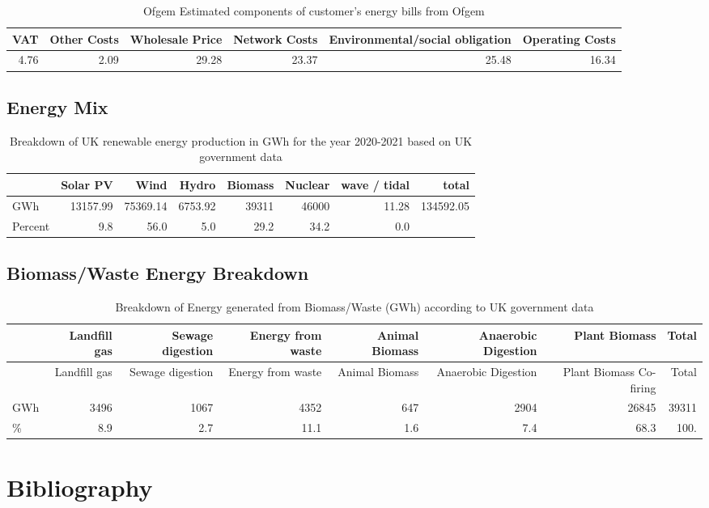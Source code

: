 \documentclass[11pt]{article}
\numberwithin{equation}{section}
\begin{document}
\begin{table}[H]
\caption{\label{tabBillBreakdown}Ofgem Estimated components of customer's energy bills from Ofgem \cite{ofgemBillBreakdown}}
\centering
\begin{tabular}{rrrrrr}
VAT & Other Costs & Wholesale Price & Network Costs & Environmental/social obligation & Operating Costs\\
\hline
4.76 & 2.09 & 29.28 & 23.37 & 25.48 & 16.34\\
\end{tabular}
\end{table}

\subsection{Energy Mix}
\label{sec:org42d2268}
\begin{table}[H]
\caption{\label{tabUkGreenEnergy2020}Breakdown of UK renewable energy production in GWh for the year 2020-2021 based on UK government data \cite{RenewableElecricityCap}}
\centering
\begin{tabular}{lrrrrrrr}
 & Solar PV & Wind & Hydro & Biomass & Nuclear & wave / tidal & total\\
\hline
GWh & 13157.99 & 75369.14 & 6753.92 & 39311 & 46000 & 11.28 & 134592.05\\
Percent & 9.8 & 56.0 & 5.0 & 29.2 & 34.2 & 0.0 & \\
\end{tabular}
\end{table}

\subsection{Biomass/Waste Energy Breakdown \label{secAppBiomassWasteEner}}
\label{sec:orgef3118b}
\begin{table}[H]
\caption{\label{tabBiomassBreakdown}Breakdown of Energy generated from Biomass/Waste (GWh) according to UK government data \cite{RenewableElecricityCap}}
\centering
\begin{tabular}{lrrrrrrr}
\toprule
 & Landfill gas & Sewage digestion & Energy from waste & Animal Biomass & Anaerobic Digestion & Plant Biomass & Total\\
\midrule
 & Landfill gas & Sewage digestion & Energy from waste & Animal Biomass & Anaerobic Digestion & Plant Biomass Co-firing & Total\\
GWh & 3496 & 1067 & 4352 & 647 & 2904 & 26845 & 39311\\
\% & 8.9 & 2.7 & 11.1 & 1.6 & 7.4 & 68.3 & 100.\\
\bottomrule
\end{tabular}
\end{table}

\section{Bibliography}
\label{sec:orgd07567b}


\end{document}
